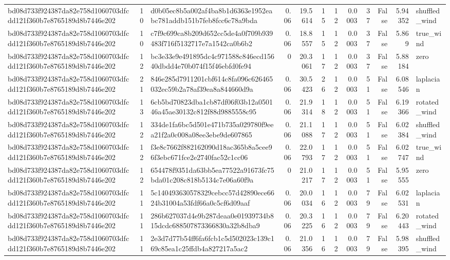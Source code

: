 \begin{tabular}{lrlrrrrrrrrl}
bd08d733f924387da82e758d1060703dfcdd121f360b7e8765189d8b7446e202 & 10 & d0b05ec8b5a002af4ba8b1d6363e1952eabc781addb151b7feb8fcc6c78a9bda & 0.06 & 19.5614 & 15 & 12 & 0.0003 & 37 & False & 5.94352 & shuffled\_wind \\
bd08d733f924387da82e758d1060703dfcdd121f360b7e8765189d8b7446e202 & 10 & c7f9c699ca8b209d652cc5de4a0f709b939483f716f5132717e7a1542ca0b6b2 & 0.06 & 18.8557 & 15 & 12 & 0.0003 & 37 & False & 5.869 & true\_wind \\
bd08d733f924387da82e758d1060703dfcdd121f360b7e8765189d8b7446e202 & 12 & bc3e33e9e491895dc4c971588c846ecd15640dbdd4e70b074f15f46ebfd0fe94 & 0 & 20.3061 & 17 & 12 & 0.0003 & 37 & False & 5.88184 & zero \\
bd08d733f924387da82e758d1060703dfcdd121f360b7e8765189d8b7446e202 & 21 & 846e285d7911201cbf614c8fa096c626465032ec59b2a78af39ea8a844660d9a & 0.06 & 30.5423 & 26 & 12 & 0.0003 & 51 & False & 6.08546 & laplacian \\
bd08d733f924387da82e758d1060703dfcdd121f360b7e8765189d8b7446e202 & 13 & 6cb5bd70823dba1cb87df06f03b12a050146a45ae30132c812f88d9885558c95 & 0.06 & 21.9314 & 18 & 12 & 0.0003 & 51 & False & 6.19366 & rotated\_wind \\
bd08d733f924387da82e758d1060703dfcdd121f360b7e8765189d8b7446e202 & 12 & 334de1fa6bc5d501e471b735a029780f9eea21f2a0c008a08ee3ebe9de607865 & 0.06 & 21.1088 & 17 & 12 & 0.0003 & 51 & False & 6.02384 & shuffled\_wind \\
bd08d733f924387da82e758d1060703dfcdd121f360b7e8765189d8b7446e202 & 12 & f3e8c7662f882162090d18ac365b8a5cee96f3ebc671fce2e2740fac52c1cc06 & 0.06 & 22.0793 & 17 & 12 & 0.0003 & 51 & False & 6.02747 & true\_wind \\
bd08d733f924387da82e758d1060703dfcdd121f360b7e8765189d8b7446e202 & 12 & 654478f9351da63bb5ea77522a91673fc75bda01c208c818b5134c7e06a60f9a & 0 & 21.0217 & 17 & 12 & 0.0003 & 51 & False & 5.95555 & zero \\
bd08d733f924387da82e758d1060703dfcdd121f360b7e8765189d8b7446e202 & 11 & 5c140493630578329cebcc57d42890ece6624b31004a53fdf66a0c5cf6d09aaf & 0.06 & 20.0034 & 16 & 12 & 0.0003 & 79 & False & 6.02531 & laplacian \\
bd08d733f924387da82e758d1060703dfcdd121f360b7e8765189d8b7446e202 & 11 & 286b627037d4e9b287deaa0e01939734b815dcdc688507873366830a32b8dba9 & 0.06 & 20.3225 & 16 & 12 & 0.0003 & 79 & False & 6.20443 & rotated\_wind \\
bd08d733f924387da82e758d1060703dfcdd121f360b7e8765189d8b7446e202 & 11 & 2e3d7d77b54ff6fa6fcb1c5d502023c139c169c85ea1c25ffdb4a827217a5ac2 & 0.06 & 21.0356 & 16 & 12 & 0.0003 & 79 & False & 5.98395 & shuffled\_wind \\

\end{tabular}
